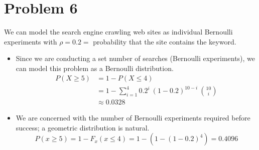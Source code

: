 \documentclass[11pt]{article}
\begin{document}
\section*{Problem 6}
We can model the search engine crawling web sites as individual Bernoulli experiments with $\rho = 0.2 = $ probability that the site contains the keyword.

\begin{itemize}
	\item
	Since we are conducting a set number of searches (Bernoulli experiments), we can model this problem as a Bernoulli distribution. 
	\begin{align*}
		P( X \ge 5) &= 1 - P(X \le 4) \\
		&= 1 - \sum _{i=1} ^4 0.2^i\ (1-0.2)^{10-i}\ \binom{10}{i}  \\
		& \approx 0.0328
	\end{align*}

	
	\item 
	We are concerned with the number of Bernoulli experiments required before success; a geometric distribution is natural.
	\[P(x \ge 5) = 1- F_x( x \le 4) = 1 -(1- (1-0.2)^4) = 0.4096 \]
	
\end{itemize}
\end{document}

